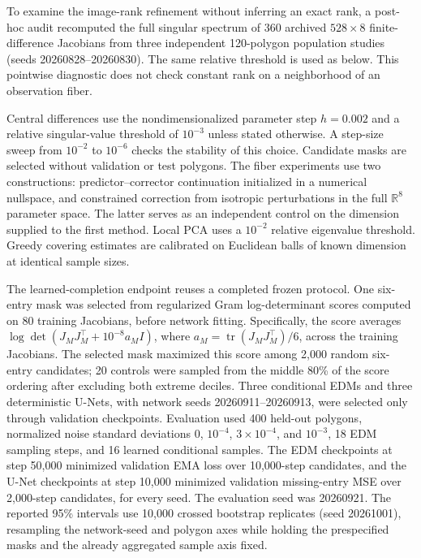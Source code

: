 \documentclass[11pt]{article}
\theoremstyle{definition}
\newcommand{\R}{\mathbb R}
\begin{document}
To examine the image-rank refinement without inferring an exact rank, a
post-hoc audit recomputed the full singular spectrum of 360 archived
$528\times8$ finite-difference Jacobians from three independent 120-polygon
population studies (seeds 20260828--20260830).  The same relative threshold is
used as below.  This pointwise diagnostic does not check constant rank on a
neighborhood of an observation fiber.

Central differences use the nondimensionalized parameter step $h=0.002$ and a
relative singular-value threshold of $10^{-3}$ unless stated otherwise.  A
step-size sweep from $10^{-2}$ to $10^{-6}$ checks the stability of this
choice.  Candidate masks are selected without validation or test polygons.
The fiber experiments use two constructions: predictor--corrector continuation
initialized in a numerical nullspace, and constrained correction from
isotropic perturbations in the full $\R^8$ parameter space.  The latter serves
as an independent control on the dimension supplied to the first method.
Local PCA uses a $10^{-2}$ relative eigenvalue threshold.  Greedy covering
estimates are calibrated on Euclidean balls of known dimension at identical
sample sizes.

The learned-completion endpoint reuses a completed frozen protocol.  One
six-entry mask was selected from regularized Gram log-determinant scores
computed on 80 training Jacobians, before network fitting.  Specifically, the
score averages $\log\det(J_MJ_M^\top+10^{-8}a_MI)$, where
$a_M=\operatorname{tr}(J_MJ_M^\top)/6$, across the training Jacobians.  The selected mask
maximized this score among 2,000 random six-entry candidates; 20 controls were
sampled from the middle 80\% of the score ordering after excluding both
extreme deciles.  Three conditional EDMs and three deterministic U-Nets, with network
seeds 20260911--20260913, were selected only through validation checkpoints.
Evaluation used 400 held-out polygons, normalized noise standard deviations
$0$, $10^{-4}$, $3\times10^{-4}$, and $10^{-3}$, 18 EDM sampling steps, and 16
learned conditional samples.  The EDM checkpoints at step 50,000 minimized
validation EMA loss over 10,000-step candidates, and the U-Net checkpoints at
step 10,000 minimized validation missing-entry MSE over 2,000-step candidates,
for every seed.  The evaluation seed was 20260921.  The reported 95\% intervals
use 10,000 crossed bootstrap replicates (seed 20261001), resampling the
network-seed and polygon axes while holding the prespecified masks and the
already aggregated sample axis fixed.
\end{document}
